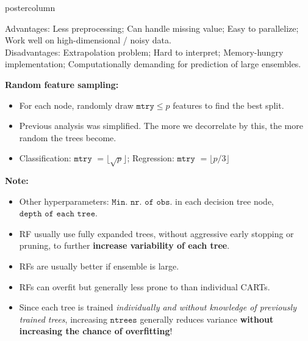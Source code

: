 \documentclass{beamer}
\newlength{\columnheight} %
\begin{document}
\begin{frame}[fragile]{}
\begin{columns}
\begin{column}{.31\textwidth}
\begin{beamercolorbox}[center]{postercolumn}
\begin{minipage}{.98\textwidth}
\parbox[t][\columnheight]{\textwidth}{
  \begin{myblock}{ }      
      Advantages: Less preprocessing; Can handle missing value; Easy to parallelize; Work well on high-dimensional / noisy data.\\
      Disadvantages: Extrapolation problem; Hard to interpret; Memory-hungry implementation; Computationally demanding for prediction of large ensembles.
        
      \begin{codebox} \textbf{Random feature sampling: }
      \end{codebox}
      \begin{itemize}[$\bullet$]     
        \setlength{\itemindent}{+.3in}
        \item For each node, randomly draw $\texttt{mtry} \le p$ features to find the best split.
        \item Previous analysis was simplified. The more we decorrelate by this,
           the more random the trees become.
        \item Classification: $\texttt{mtry}$ $ = \lfloor \sqrt{p} \rfloor$; Regression: $\texttt{mtry}$ $ = \lfloor p/3 \rfloor$
        \end{itemize}

        \begin{codebox} \textbf{Note:}
        \end{codebox}
        \begin{itemize}[$\bullet$]     
          \setlength{\itemindent}{+.3in}
          \item Other hyperparameters: $\texttt{Min. nr. of obs.}$ in each decision tree node, $\texttt{depth of each tree}$.
          \item RF usually use fully expanded trees, without aggressive early stopping or pruning, to further \textbf{increase variability of each tree}.\\
          \item RFs are usually better if ensemble is large.
          \item RFs can overfit but generally less prone to than individual CARTs.
          \item Since each tree is trained \textit{individually and without knowledge of previously trained trees}, 
          increasing $\texttt{ntrees}$ generally reduces variance \textbf{without increasing the chance of overfitting}!
        \end{itemize}
      \end{myblock}

}
\end{minipage}
\end{beamercolorbox}
\end{column}
\end{columns}
\end{frame}
\end{document}

